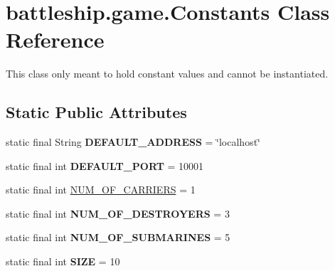 \hypertarget{classbattleship_1_1game_1_1Constants}{}\section{battleship.\+game.\+Constants Class Reference}
\label{classbattleship_1_1game_1_1Constants}


This class only meant to hold constant values and cannot be instantiated.  


\subsection*{Static Public Attributes}
\begin{DoxyCompactItemize}
\item 
\hypertarget{classbattleship_1_1game_1_1Constants_ab043dd2b0a3d43af1dd14c3b3798a6b4}{}static final String {\bfseries D\+E\+F\+A\+U\+L\+T\+\_\+\+A\+D\+D\+R\+E\+S\+S} = \char`\"{}localhost\char`\"{}\label{classbattleship_1_1game_1_1Constants_ab043dd2b0a3d43af1dd14c3b3798a6b4}

\item 
\hypertarget{classbattleship_1_1game_1_1Constants_a95063f4fe98c115291fabd60affdb400}{}static final int {\bfseries D\+E\+F\+A\+U\+L\+T\+\_\+\+P\+O\+R\+T} = 10001\label{classbattleship_1_1game_1_1Constants_a95063f4fe98c115291fabd60affdb400}

\item 
static final int \hyperlink{classbattleship_1_1game_1_1Constants_aadb1c142f1d3dcf51377758034c71ed6}{N\+U\+M\+\_\+\+O\+F\+\_\+\+C\+A\+R\+R\+I\+E\+R\+S} = 1
\item 
\hypertarget{classbattleship_1_1game_1_1Constants_a18704602096f558aa92d582cf0043f02}{}static final int {\bfseries N\+U\+M\+\_\+\+O\+F\+\_\+\+D\+E\+S\+T\+R\+O\+Y\+E\+R\+S} = 3\label{classbattleship_1_1game_1_1Constants_a18704602096f558aa92d582cf0043f02}

\item 
\hypertarget{classbattleship_1_1game_1_1Constants_acfb688b94958bd74bc1896dec1b23582}{}static final int {\bfseries N\+U\+M\+\_\+\+O\+F\+\_\+\+S\+U\+B\+M\+A\+R\+I\+N\+E\+S} = 5\label{classbattleship_1_1game_1_1Constants_acfb688b94958bd74bc1896dec1b23582}

\item 
\hypertarget{classbattleship_1_1game_1_1Constants_a0dff46490a00b98866dcc4a12064f567}{}static final int {\bfseries S\+I\+Z\+E} = 10\label{classbattleship_1_1game_1_1Constants_a0dff46490a00b98866dcc4a12064f567}


\end{DoxyCompactItemize}
